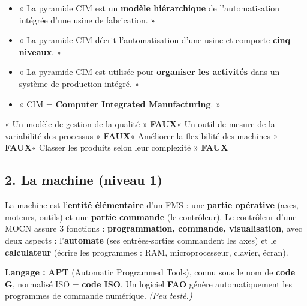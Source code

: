 \documentclass[11pt,a4paper]{article}
\newcommand{\faux}{\textcolor{rouge}{\textbf{FAUX}}}
\begin{document}
\begin{examen}
\begin{itemize}
\item « La pyramide CIM est un \textbf{modèle hiérarchique} de l'automatisation intégrée d'une usine de fabrication. »
\item « La pyramide CIM décrit l'automatisation d'une usine et comporte \textbf{cinq niveaux}. »
\item « La pyramide CIM est utilisée pour \textbf{organiser les activités} dans un système de production intégré. »
\item « CIM = \textbf{Computer Integrated Manufacturing}. »
\end{itemize}
\end{examen}
\begin{piege}
« Un modèle de gestion de la qualité » \faux \quad « Un outil de mesure de la variabilité des processus » \faux \quad « Améliorer la flexibilité des machines » \faux \quad « Classer les produits selon leur complexité » \faux
\end{piege}

\subsection*{2. La machine (niveau 1)}
La machine est l'\textbf{entité élémentaire} d'un FMS : une \textbf{partie opérative} (axes, moteurs, outils) et une \textbf{partie commande} (le contrôleur). Le contrôleur d'une MOCN assure 3 fonctions : \textbf{programmation, commande, visualisation}, avec deux aspects : l'\textbf{automate} (ses entrées-sorties commandent les axes) et le \textbf{calculateur} (écrire les programmes : RAM, microprocesseur, clavier, écran).

\textbf{Langage :} \textbf{APT} (Automatic Programmed Tools), connu sous le nom de \textbf{code G}, normalisé ISO = \textbf{code ISO}. Un logiciel \textbf{FAO} génère automatiquement les programmes de commande numérique. \textit{(Peu testé.)}
\end{document}
